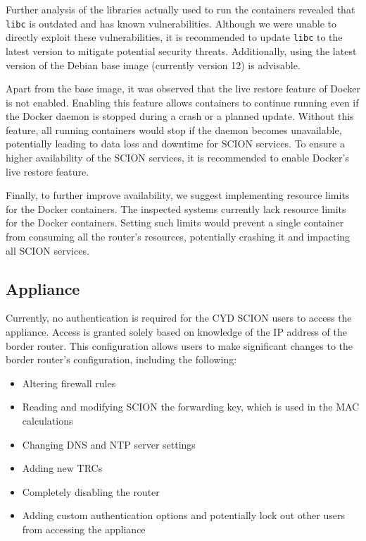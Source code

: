 Further analysis of the libraries actually used to run the containers revealed that \texttt{libc} is outdated and has known vulnerabilities.
Although we were unable to directly exploit these vulnerabilities, it is recommended to update \texttt{libc} to the latest version to mitigate potential security threats.
Additionally, using the latest version of the Debian base image (currently version 12) is advisable.

Apart from the base image, it was observed that the live restore feature of Docker is not enabled.
Enabling this feature allows containers to continue running even if the Docker daemon is stopped during a crash or a planned update.
Without this feature, all running containers would stop if the daemon becomes unavailable, potentially leading to data loss and downtime for SCION services.
To ensure a higher availability of the SCION services, it is recommended to enable Docker's live restore feature.

Finally, to further improve availability, we suggest implementing resource limits for the Docker containers.
The inspected systems currently lack resource limits for the Docker containers.
Setting such limits would prevent a single container from consuming all the router's resources, potentially crashing it and impacting all SCION services.



\subsection{Appliance}
Currently, no authentication is required for the CYD SCION users to access the appliance.
Access is granted solely based on knowledge of the IP address of the border router.
This configuration allows users to make significant changes to the border router's configuration, including the following:

\begin{itemize}
    \item Altering firewall rules
    \item Reading and modifying SCION the forwarding key, which is used in the MAC calculations
    \item Changing DNS and NTP server settings
    \item Adding new TRCs
    \item Completely disabling the router
    \item Adding custom authentication options and potentially lock out other users from accessing the appliance
\end{itemize}


